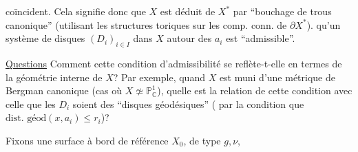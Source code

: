 
coïncident. Cela signifie donc que $X$ est déduit de $X^*$ par ``bouchage de trous  canonique'' (utilisant les structures toriques sur les comp. conn. de $\partial X^*$).   qu'un système de disques $(D_i)_{i\in I}$ dans $X$  autour des $a_i$ est ``admissible''.

\uline{Questions} Comment cette condition d'admissibilité se reflète-t-elle en termes de la géométrie interne de $X$? Par exemple,  quand $X$ est muni d'une métrique de Bergman canonique (cas où $X\not\simeq\mathbb P^1_{\mathbb C}$), quelle est la relation de cette condition avec celle que les \deleted{$\partial$}$D_i$ soient des ``disques géodésiques'' ( par la condition que $\text{dist. géod}(x,a_i)\leq r_i$)?

Fixons une  surface   à bord de référence \deleted{\unsure{(}} $X_0$, de type $g,\nu$,
